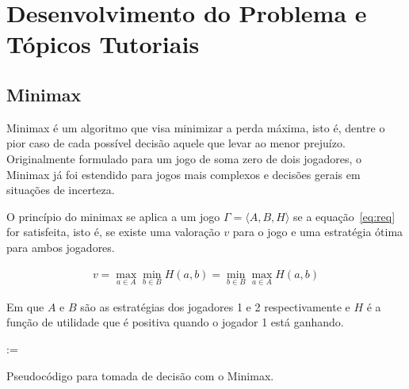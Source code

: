 \chapter{Desenvolvimento do Problema e Tópicos Tutoriais}\label{cap:minimax}




\section{Minimax}

Minimax é um algoritmo que visa minimizar a perda máxima, isto é, dentre o pior
caso de cada possível decisão aquele que levar ao menor prejuízo.  Originalmente
formulado para um jogo de soma zero de dois jogadores, o Minimax já foi
estendido para jogos mais complexos e decisões gerais em situações de incerteza.

O princípio do minimax se aplica a um jogo $\Gamma=\langle A,B,H\rangle$ se a
equação~\ref{eq:req} for satisfeita, isto é, se existe uma valoração $v$ para o
jogo e uma estratégia ótima para ambos jogadores.
\cite{hazewinkel2002encyclopaedia}

\begin{gather}
  v=\max_{a\in A}\min_{b\in B}H(a,b)=\min_{b\in B}\max_{a\in A}H(a,b)\label{eq:req}
\end{gather}

Em que $A$ e $B$ são as estratégias dos jogadores 1 e 2 respectivamente e $H$ é
a função de utilidade que é positiva quando o jogador 1 está ganhando.

\begin{algorithm}


   := 

  \;

  \caption{Pseudocódigo para tomada de decisão com o Minimax.}\label{lst:minimax}
\end{algorithm}

